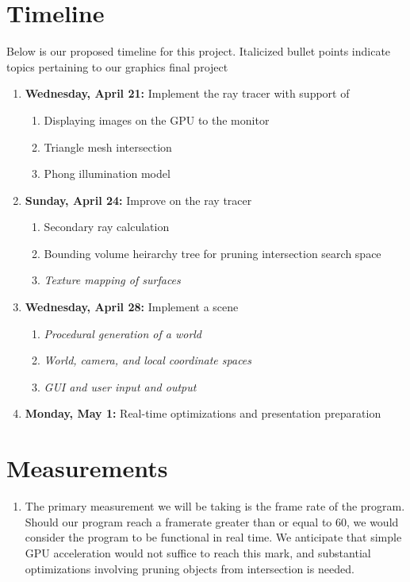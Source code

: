 \documentclass[11pt]{article}
\begin{document}
\section{Timeline}
Below is our proposed timeline for this project. Italicized bullet points indicate topics pertaining
to our graphics final project
\begin{enumerate}
    \item \textbf{Wednesday, April 21:} Implement the ray tracer with support of
          \begin{enumerate}
              \item Displaying images on the GPU to the monitor
              \item Triangle mesh intersection
              \item Phong illumination model
          \end{enumerate}
    \item \textbf{Sunday, April 24:} Improve on the ray tracer
          \begin{enumerate}
              \item Secondary ray calculation
              \item Bounding volume heirarchy tree for pruning intersection search space
              \item \textit{Texture mapping of surfaces}
          \end{enumerate}
    \item \textbf{Wednesday, April 28:} Implement a scene
          \begin{enumerate}
              \item \textit{Procedural generation of a world}
              \item \textit{World, camera, and local coordinate spaces}
              \item \textit{GUI and user input and output}
          \end{enumerate}
    \item \textbf{Monday, May 1:} Real-time optimizations and presentation preparation
\end{enumerate}

\section{Measurements}
\begin{enumerate}
    \item The primary measurement we will be taking is the frame rate of the program. Should our
          program reach a framerate greater than or equal to 60, we would consider the program to be functional
          in real time. We anticipate that simple GPU acceleration would not suffice to reach this mark,
          and substantial optimizations involving pruning objects from intersection is needed.
\end{enumerate}
\end{document}
